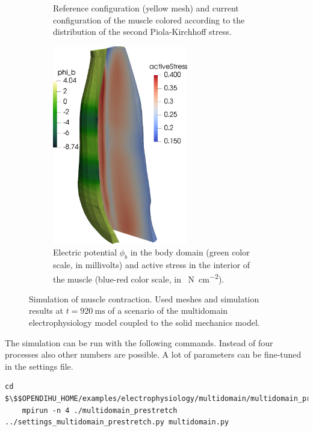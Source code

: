 \begin{figure}
\begin{subfigure}[t]{0.31\textwidth}
    \caption{Reference configuration (yellow mesh) and current configuration of the muscle colored according to the distribution of the second Piola-Kirchhoff stress.}%
    \label{fig:multidomain_prestretch6}%
  \end{subfigure}\qquad
  \begin{subfigure}[t]{0.31\textwidth}%
    \centering%
    \includegraphics[height=87mm]{images/results/application/multidomain_prestretch2.png}%
    \caption{Electric potential $\phi_b$ in the body domain (green color scale, in millivolts) and active stress in the interior of the muscle (blue-red color scale, in \SI{}{\newton\per\centi\meter\squared}).}%
    \label{fig:multidomain_prestretch2}%
  \end{subfigure}
  \hfill
  \caption{Simulation of muscle contraction. Used meshes and simulation results at $t=\SI{920}{\ms}$ of a scenario of the multidomain electrophysiology model coupled to the solid mechanics model.}%
  \label{fig:multidomain_prestretch}%
\end{figure}%




\begin{reproduce_no_break}
  The simulation can be run with the following commands. Instead of four processes also other numbers are possible. A lot of parameters can be fine-tuned in the  settings file.
  \begin{lstlisting}[columns=fullflexible,breaklines=true,postbreak=\mbox{\textcolor{gray}{$\hookrightarrow$}\space}]
    cd $\$$OPENDIHU_HOME/examples/electrophysiology/multidomain/multidomain_prestretch/build_release
    mpirun -n 4 ./multidomain_prestretch ../settings_multidomain_prestretch.py multidomain.py
  \end{lstlisting}
\end{reproduce_no_break}

